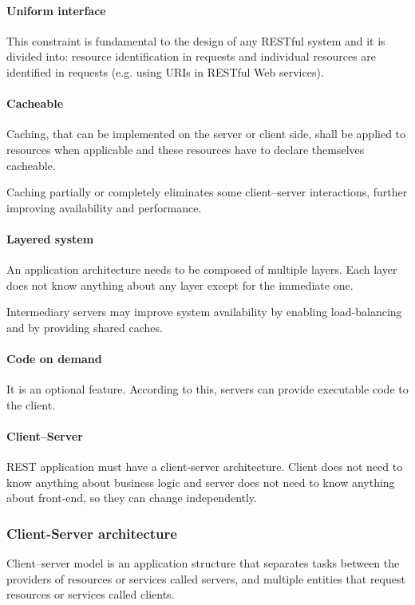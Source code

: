\paragraph{Uniform interface}
This constraint is fundamental to the design of any RESTful system and it is divided into:
resource identification in requests and individual resources are identified in requests (e.g. using URIs in RESTful Web services). 

\paragraph{Cacheable}
Caching, that can be implemented on the server or client side, shall be applied to resources when applicable and these resources have to declare themselves cacheable.

Caching partially or completely eliminates some client–server interactions, further improving availability and performance.

\paragraph{Layered system}
An application architecture needs to be composed of multiple layers. Each layer does not know anything about any layer except for the immediate one. 

Intermediary servers may improve system availability by enabling load-balancing and by providing shared caches.

\paragraph{Code on demand}
It is an optional feature. According to this, servers can provide executable code to the client.

\paragraph{Client–Server}
REST application must have a client-server architecture. Client does not need to know anything about business logic and server does not need to know anything about front-end, so they can change independently.


\subsubsection{Client-Server architecture}
Client–server model is an application structure that separates tasks between the providers of resources or services called servers, and multiple entities that request resources or services called clients.

